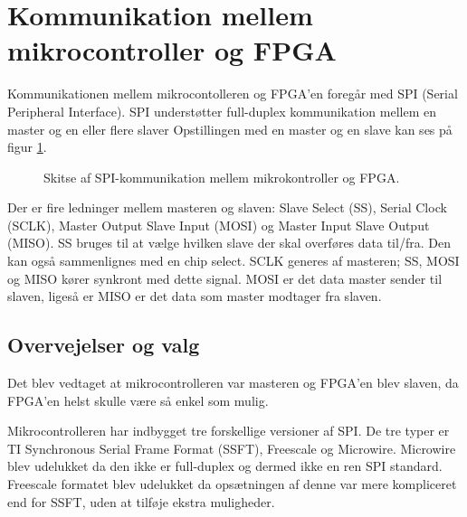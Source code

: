 \section{Kommunikation mellem mikrocontroller og FPGA}



Kommunikationen mellem mikrocontolleren og FPGA’en foregår med SPI (Serial Peripheral Interface). SPI understøtter full-duplex kommunikation mellem en master og en eller flere slaver
Opstillingen med en master og en slave kan ses på figur \ref{fig:SPImasterslave}.
\begin{figure}[!th]
\centering
\begin{tikzpicture}[scale=0.8]

\end{tikzpicture}
\caption[SPI protokol]{Skitse af SPI-kommunikation mellem mikrokontroller og FPGA.}
\label{fig:SPImasterslave}
\end{figure}

Der er fire ledninger mellem masteren og slaven: Slave Select (SS), Serial Clock (SCLK), Master Output Slave Input (MOSI) og Master Input Slave Output (MISO). SS bruges til at vælge hvilken slave der skal overføres data til/fra. Den kan også sammenlignes med en chip select. SCLK generes af masteren; SS, MOSI og MISO kører synkront med dette signal. MOSI er det data master sender til slaven, ligeså er MISO er det data som master modtager fra slaven.

\subsection{Overvejelser og valg}

Det blev vedtaget at mikrocontrolleren var masteren og FPGA'en blev slaven, da FPGA'en helst skulle være så enkel som mulig.

Mikrocontrolleren har indbygget tre forskellige versioner af SPI. De tre typer er TI Synchronous Serial Frame Format (SSFT), Freescale og Microwire. 
Microwire blev udelukket da den ikke er full-duplex og dermed ikke en ren SPI standard. 
Freescale formatet blev udelukket da opsætningen af denne var mere kompliceret end for SSFT, uden at tilføje ekstra muligheder. 

